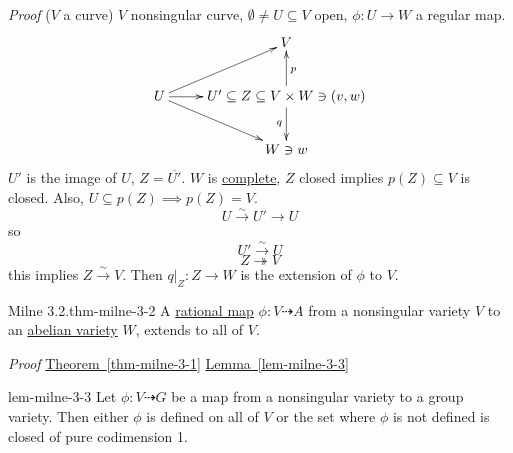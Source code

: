 \documentclass[10pt,]{book}
\makeatletter
\renewcommand*{\proofname}{Proof}
\renewenvironment{proof}[1][\proofname]{\par
  \pushQED{\qed}%
  \normalfont \topsep6\p@\@plus6\p@\relax
  \trivlist
  \item\relax
    {\itshape
    #1\@addpunct{.}}\hspace\labelsep\ignorespaces
}{%
  \popQED\endtrivlist\@endpefalse
}
\numberwithin{equation}{section}
\makeatother
\begin{document}
\begin{proof}\hypertarget{proof-12}{}
\hypertarget{p-88}{}%
(\(V\) a curve) \(V\) nonsingular curve, \(\emptyset\ne U\subseteq V\) open, \(\phi\colon U \to W\) a regular map.%
\begin{equation*}
\xymatrix{
& V\\
U\ar[ur]\ar[dr] \ar[r] & U' \subseteq Z \subseteq V\times W \ni (v,w)\ar[d]_q \ar[u]_p \\
& W \ni w
}
\end{equation*}
\(U'\) is the image of \(U\), \(Z = \overline{U'}\). \(W \) is \hyperref[def-abelian-complete-var]{complete}, \(Z\) closed implies \(p(Z) \subseteq V\) is closed. Also, \(U \subseteq p(Z) \implies p(Z)= V\).%
\begin{equation*}
U\xrightarrow{\sim} U' \to U
\end{equation*}
so%
\begin{equation*}
U' \xrightarrow{\sim} U
\end{equation*}
%
\begin{equation*}
Z \twoheadrightarrow V
\end{equation*}
this implies \(Z \xrightarrow\sim V\). Then \(q|_Z \colon Z \to W\) is the extension of \(\phi \) to \(V\).%
\end{proof}
\begin{theorem}{Milne 3.2.}{}{thm-milne-3-2}%
\hypertarget{p-89}{}%
A \hyperref[def-rational-map]{rational map} \(\phi\colon V\dashrightarrow A\) from a nonsingular variety \(V\) to an \hyperref[def-buntes-abvar]{abelian variety} \(W\), extends to all of \(V\).%
\end{theorem}
\begin{proof}\hypertarget{proof-13}{}
\hypertarget{p-90}{}%
\hyperref[thm-milne-3-1]{Theorem~\ref{thm-milne-3-1}} \hyperref[lem-milne-3-3]{Lemma~\ref{lem-milne-3-3}}%
\end{proof}
\begin{lemma}{}{}{lem-milne-3-3}%
\hypertarget{p-91}{}%
Let \(\phi\colon V \dashrightarrow G\) be a map from a nonsingular variety to a group variety. Then either \(\phi\) is defined on all of \(V\) or the set where \(\phi\) is not defined is closed of pure codimension 1.%
\end{lemma}
\end{document}
